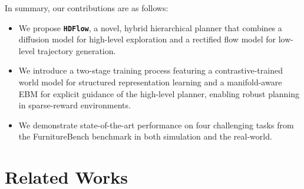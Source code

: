 \documentclass{article} %
\begin{document}
In summary, our contributions are as follows:
\begin{itemize}
    \item We propose \texttt{\textbf{HDFlow}}, a novel, hybrid hierarchical planner that combines a diffusion model for high-level exploration and a rectified flow model for low-level trajectory generation.
    \item We introduce a two-stage training process featuring a contrastive-trained world model for structured representation learning and a manifold-aware EBM for explicit guidance of the high-level planner, enabling robust planning in sparse-reward environments.
    \item We demonstrate state-of-the-art performance on four challenging tasks from the FurnitureBench benchmark in both simulation and the real-world.
\end{itemize}

\section{Related Works}
\vspace{-8pt}
\end{document}
